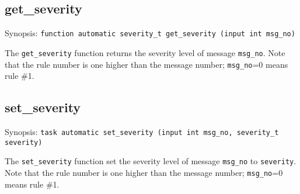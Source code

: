 \subsection{get\_severity}\label{get_severity}

Synopsis: \texttt{function automatic severity\_t get\_severity (input int msg\_no)}

The \texttt{get\_severity} function returns the severity level of message \texttt{msg\_no}.
Note that the rule number is one higher than the message number; \texttt{msg\_no}=0 means rule \#1.

\subsection{set\_severity}\label{set_severity}

Synopsis: \texttt{task automatic set\_severity (input int msg\_no, severity\_t severity)}

The \texttt{set\_severity} function set the severity level of message \texttt{msg\_no} to \texttt{severity}.
Note that the rule number is one higher than the message number; \texttt{msg\_no}=0 means rule \#1.